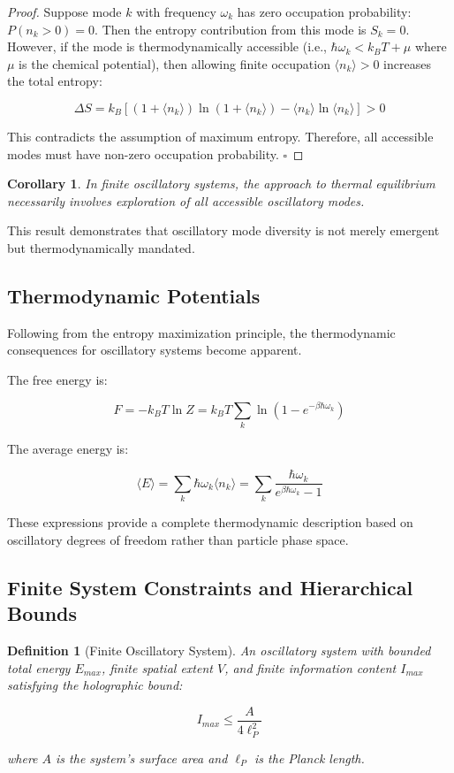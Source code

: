 \documentclass[11pt]{article}
\newtheorem{corollary}[theorem]{Corollary}
\newtheorem{definition}[theorem]{Definition}
\theoremstyle{remark}
\begin{document}
\begin{proof}
Suppose mode $k$ with frequency $\omega_k$ has zero occupation probability: $P(n_k > 0) = 0$. Then the entropy contribution from this mode is $S_k = 0$. However, if the mode is thermodynamically accessible (i.e., $\hbar\omega_k < k_BT + \mu$ where $\mu$ is the chemical potential), then allowing finite occupation $\langle n_k\rangle > 0$ increases the total entropy:

$$\Delta S = k_B[(1 + \langle n_k\rangle)\ln(1 + \langle n_k\rangle) - \langle n_k\rangle\ln\langle n_k\rangle] > 0$$

This contradicts the assumption of maximum entropy. Therefore, all accessible modes must have non-zero occupation probability. $\square$
\end{proof}

\begin{corollary}
In finite oscillatory systems, the approach to thermal equilibrium necessarily involves exploration of all accessible oscillatory modes.
\end{corollary}

This result demonstrates that oscillatory mode diversity is not merely emergent but thermodynamically mandated.

\subsection{Thermodynamic Potentials}

Following from the entropy maximization principle, the thermodynamic consequences for oscillatory systems become apparent.

The free energy is:

$$F = -k_B T \ln Z = k_B T \sum_k \ln(1 - e^{-\beta\hbar\omega_k})$$

The average energy is:

$$\langle E\rangle = \sum_k \hbar\omega_k \langle n_k\rangle = \sum_k \frac{\hbar\omega_k}{e^{\beta\hbar\omega_k} - 1}$$

These expressions provide a complete thermodynamic description based on oscillatory degrees of freedom rather than particle phase space.

\subsection{Finite System Constraints and Hierarchical Bounds}

\begin{definition}[Finite Oscillatory System]
An oscillatory system with bounded total energy $E_{max}$, finite spatial extent $V$, and finite information content $I_{max}$ satisfying the holographic bound:

$$I_{max} \leq \frac{A}{4\ell_P^2}$$

where $A$ is the system's surface area and $\ell_P$ is the Planck length.
\end{definition}
\end{document}
